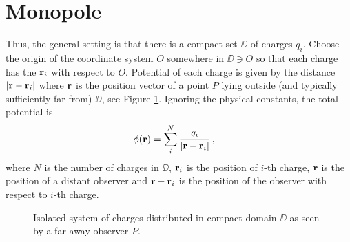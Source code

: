 \section{Monopole}
\label{sec:monopole}


Thus, the general setting is that there is a compact set $\DD$ of charges $q_i$. Choose the origin of the coordinate system $O$ somewhere in $\DD \ni O$ so that each charge has the  $\mathbf{r}_i$ with respect to $O$. Potential of each charge is given by the distance $|\mathbf{r}-\mathbf{r}_i|$ where $\mathbf{r}$ is the position vector of a point $P$ lying outside (and typically sufficiently far from) $\DD$, see Figure \ref{fig:isolated-system}. Ignoring the physical constants, the total potential is
\begin{align}\label{eq:potential-sum}
    \phi(\mathbf{r}) &= \sum_{i}^N \frac{q_i}{|\mathbf{r}-\mathbf{r}_i|}\, ,
\end{align}
where $N$ is the number of charges in $\DD$, $\mathbf{r}_i$ is the position of $i$-th charge, $\mathbf{r}$ is the position of a distant observer and $\mathbf{r}-\mathbf{r}_i$ is the position of the observer with respect to $i$-th charge. 


\begin{figure}
    \centering
{}    \caption{Isolated system of charges distributed in compact domain $\DD$ as seen by a far-away observer $P$.}
    \label{fig:isolated-system}
\end{figure}


